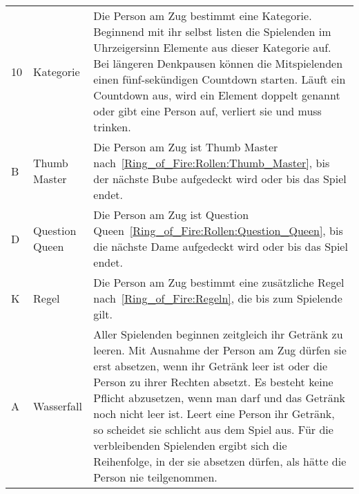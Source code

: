 \begin{enumerate}[label={(\arabic*)}]
\begin{tabulary}{\textwidth}{llL}
		10 & Kategorie      & Die Person am Zug bestimmt eine Kategorie.
		Beginnend mit ihr selbst listen die Spielenden im Uhrzeigersinn Elemente aus dieser Kategorie auf.
		Bei längeren Denkpausen können die Mitspielenden einen fünf-sekündigen Countdown starten.
		Läuft ein Countdown aus, wird ein Element doppelt genannt oder gibt eine Person auf, verliert sie und muss trinken.                                                        \\[1ex]
		B  & Thumb Master   & Die Person am Zug ist Thumb Master nach~\ref{Ring_of_Fire:Rollen:Thumb_Master}, bis der nächste Bube aufgedeckt wird oder bis das Spiel endet.                                                         \\[1ex]
		D  & Question Queen & Die Person am Zug ist Question Queen~\ref{Ring_of_Fire:Rollen:Question_Queen}, bis die nächste Dame aufgedeckt wird oder bis das Spiel endet.                                                       \\[1ex]
		K  & Regel          & Die Person am Zug bestimmt eine zusätzliche Regel nach~\ref{Ring_of_Fire:Regeln}, die bis zum Spielende gilt.                                                                       \\[1ex]
		A  & Wasserfall     & Aller Spielenden beginnen zeitgleich ihr Getränk zu leeren.
		Mit Ausnahme der Person am Zug dürfen sie erst absetzen, wenn ihr Getränk leer ist oder die Person zu ihrer Rechten absetzt.
		Es besteht keine Pflicht abzusetzen, wenn man darf und das Getränk noch nicht leer ist.
		Leert eine Person ihr Getränk, so scheidet sie schlicht aus dem Spiel aus.
		Für die verbleibenden Spielenden ergibt sich die Reihenfolge, in der sie absetzen dürfen, als hätte die Person nie teilgenommen.                                           \\[1ex]
		\bottomrule
	\end{tabulary}
\end{enumerate}

